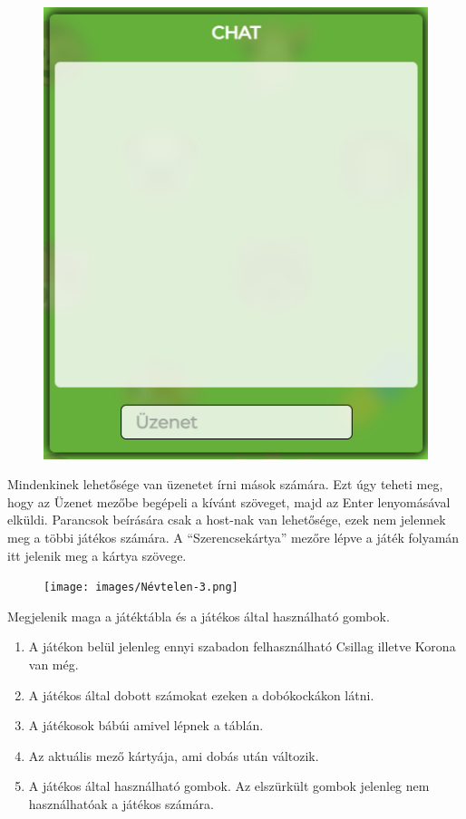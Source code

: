 \begin{figure}[h!]
\centering
\includegraphics[scale=0.4]{images/50363fc646a02ca3f5dd4684b7066bac.png}
\label{fig:ff}
\end{figure}

Mindenkinek lehetősége van üzenetet írni mások számára. Ezt úgy teheti meg, hogy az Üzenet mezőbe begépeli a kívánt szöveget, majd az Enter lenyomásával elküldi. Parancsok beírására csak a host-nak van lehetősége, ezek nem jelennek meg a többi játékos számára. A “Szerencsekártya” mezőre lépve a játék folyamán itt jelenik meg a kártya szövege.
\newpage
{}

\begin{figure}[h!]
\centering
\texttt{[image: images/Névtelen-3.png]}
\label{fig:ff}
\end{figure}
Megjelenik maga a játéktábla és a játékos által használható gombok.
\begin{enumerate}
	\item A játékon belül jelenleg ennyi szabadon felhasználható Csillag illetve Korona van még.
	\item A játékos által dobott számokat ezeken a dobókockákon látni.
	\item A játékosok bábúi amivel lépnek a táblán.
	\item Az aktuális mező kártyája, ami dobás után változik.
	\item A játékos által használható gombok. Az elszürkült gombok jelenleg nem használhatóak a játékos számára.
\end{enumerate}

